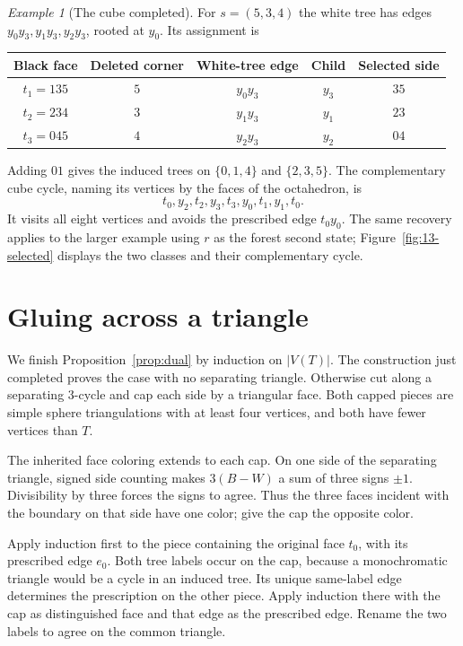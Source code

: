 \documentclass[10pt,a4paper]{amsart}
\theoremstyle{remark}
\newtheorem*{example}{Example}
\begin{document}
\begin{example}[The cube completed]
For $s=(5,3,4)$ the white tree has edges $y_0y_3,y_1y_3,y_2y_3$, rooted at $y_0$. Its assignment is
\begin{center}
\begin{tabular}{@{}ccccc@{}}\toprule
Black face & Deleted corner & White-tree edge & Child & Selected side\\\midrule
$t_1=135$ & $5$ & $y_0y_3$ & $y_3$ & $35$\\
$t_2=234$ & $3$ & $y_1y_3$ & $y_1$ & $23$\\
$t_3=045$ & $4$ & $y_2y_3$ & $y_2$ & $04$\\\bottomrule
\end{tabular}
\end{center}
Adding $01$ gives the induced trees on $\{0,1,4\}$ and $\{2,3,5\}$. The complementary cube cycle, naming its vertices by the faces of the octahedron, is
\[
 t_0,y_2,t_2,y_3,t_3,y_0,t_1,y_1,t_0.
\]
It visits all eight vertices and avoids the prescribed edge $t_0y_0$.
The same recovery applies to the larger example using $r$ as the forest second state; Figure~\ref{fig:13-selected} displays the two classes and their complementary cycle.
\end{example}

\section{Gluing across a triangle}\label{sec:glue}
We finish Proposition~\ref{prop:dual} by induction on $|V(T)|$. The construction just completed proves the case with no separating triangle. Otherwise cut along a separating 3-cycle and cap each side by a triangular face. Both capped pieces are simple sphere triangulations with at least four vertices, and both have fewer vertices than $T$.

The inherited face coloring extends to each cap. On one side of the separating triangle, signed side counting makes $3(B-W)$ a sum of three signs $\pm1$. Divisibility by three forces the signs to agree. Thus the three faces incident with the boundary on that side have one color; give the cap the opposite color.

Apply induction first to the piece containing the original face $t_0$, with its prescribed edge $e_0$. Both tree labels occur on the cap, because a monochromatic triangle would be a cycle in an induced tree. Its unique same-label edge determines the prescription on the other piece. Apply induction there with the cap as distinguished face and that edge as the prescribed edge. Rename the two labels to agree on the common triangle.
\end{document}
